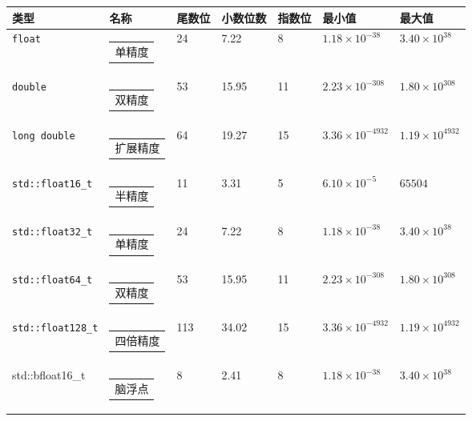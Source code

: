 \begin{longtable}{|l|l|l|l|l|l|l|}
\hline
\textbf{类型} &
\textbf{名称} &
\textbf{尾数位} &
\textbf{小数位数} &
\textbf{指数位} &
\textbf{最小值} &
\textbf{最大值} \\ \hline
\endfirsthead
%
\endhead
%
\verb|float|    & \begin{tabular}[c]{@{}l@{}}单精度\end{tabular}   & 24 & 7.22  & 8  & $1.18 \times 10^{-38}$   & $3.40 \times 10^{38}$   \\ \hline
\verb|double|   & \begin{tabular}[c]{@{}l@{}}双精度\end{tabular}   & 53 & 15.95 & 11 & $2.23 \times 10^{-308}$  & $1.80 \times 10^{308}$  \\ \hline
\verb|long double| & \begin{tabular}[c]{@{}l@{}}扩展精度\end{tabular} & 64 & 19.27 & 15 & $3.36 \times 10^{-4932}$ & $1.19 \times 10^{4932}$ \\ \hline
\verb|std::float16_t| & \begin{tabular}[c]{@{}l@{}}半精度\end{tabular}     & 11 & 3.31  & 5  & $6.10 \times 10^{-5}$    & $65504$       \\ \hline
\verb|std::float32_t| & \begin{tabular}[c]{@{}l@{}}单精度\end{tabular}   & 24 & 7.22  & 8  & $1.18 \times 10^{-38}$   & $3.40 \times 10^{38}$   \\ \hline
\verb|std::float64_t| & \begin{tabular}[c]{@{}l@{}}双精度\end{tabular}   & 53 & 15.95 & 11 & $2.23 \times 10^{-308}$  & $1.80 \times 10^{308}$  \\ \hline
\verb|std::float128_t| &
\begin{tabular}[c]{@{}l@{}}四倍精度\end{tabular} &
113 &
34.02 &
15 &
$3.36 \times 10^{-4932}$ &
$1.19 \times 10^{4932}$ \\ \hline
std::bfloat16\_t &
\begin{tabular}[c]{@{}l@{}}脑浮点\end{tabular} &
8 &
2.41 &
8 &
$1.18 \times 10^{-38}$ &
$3.40 \times 10^{38}$ \\ \hline
\end{longtable}

